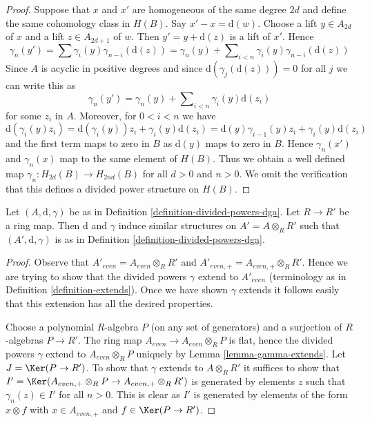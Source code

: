 \begin{proof}
Suppose that $x$ and $x'$ are homogeneous of the same degree $2d$
and define the same cohomology class in $H(B)$. Say $x' - x = \text{d}(w)$.
Choose a lift $y \in A_{2d}$ of $x$ and a lift $z \in A_{2d + 1}$
of $w$. Then $y' = y + \text{d}(z)$ is a lift of $x'$.
Hence
$$
\gamma_n(y') = \sum \gamma_i(y) \gamma_{n - i}(\text{d}(z))
= \gamma_n(y) +
\sum\nolimits_{i < n} \gamma_i(y) \gamma_{n - i}(\text{d}(z))
$$
Since $A$ is acyclic in positive degrees and since
$\text{d}(\gamma_j(\text{d}(z))) = 0$ for all $j$ we can write
this as
$$
\gamma_n(y') = \gamma_n(y) +
\sum\nolimits_{i < n} \gamma_i(y) \text{d}(z_i)
$$
for some $z_i$ in $A$. Moreover, for $0 < i < n$ we have
$$
\text{d}(\gamma_i(y) z_i) =
\text{d}(\gamma_i(y))z_i + \gamma_i(y)\text{d}(z_i) =
\text{d}(y) \gamma_{i - 1}(y) z_i + \gamma_i(y)\text{d}(z_i)
$$
and the first term maps to zero in $B$ as $\text{d}(y)$ maps to zero in $B$.
Hence $\gamma_n(x')$ and $\gamma_n(x)$ map to the same element of $H(B)$.
Thus we obtain a well defined map $\gamma_n : H_{2d}(B) \to H_{2nd}(B)$
for all $d > 0$ and $n > 0$. We omit the verification that this
defines a divided power structure on $H(B)$.
\end{proof}

\begin{lemma}
\label{lemma-base-change-div}
Let $(A, \text{d}, \gamma)$ be as in
Definition \ref{definition-divided-powers-dga}.
Let $R \to R'$ be a ring map.
Then $\text{d}$ and $\gamma$ induce similar structures on
$A' = A \otimes_R R'$ such that $(A', \text{d}, \gamma)$ is as in
Definition \ref{definition-divided-powers-dga}.
\end{lemma}

\begin{proof}
Observe that $A'_{even} = A_{even} \otimes_R R'$ and
$A'_{even, +} = A_{even, +} \otimes_R R'$. Hence we are trying to
show that the divided powers $\gamma$ extend to $A'_{even}$
(terminology as in Definition \ref{definition-extends}).
Once we have shown $\gamma$ extends it follows easily that this
extension has all the desired properties.

\medskip\noindent
Choose a polynomial $R$-algebra $P$ (on any set of generators)
and a surjection of $R$-algebras
$P \to R'$. The ring map $A_{even} \to A_{even} \otimes_R P$ is flat,
hence the divided powers $\gamma$ extend to $A_{even} \otimes_R P$
uniquely by Lemma \ref{lemma-gamma-extends}.
Let $J = \Ker(P \to R')$. To show that $\gamma$ extends
to $A \otimes_R R'$ it suffices to show that
$I' = \Ker(A_{even, +} \otimes_R P \to A_{even, +} \otimes_R R')$
is generated by elements $z$ such that $\gamma_n(z) \in I'$
for all $n > 0$. This is clear as $I'$ is generated by elements
of the form $x \otimes f$ with
$x \in A_{even, +}$ and $f \in \Ker(P \to R')$.
\end{proof}

